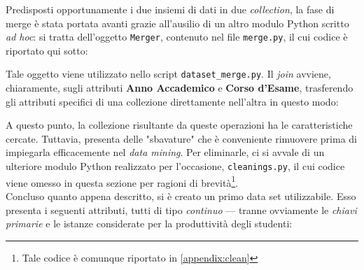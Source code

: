 		Predisposti opportunamente i due insiemi di dati in due \textit{collection}, la fase di merge è stata portata avanti grazie all'ausilio di un altro modulo Python scritto \textit{ad hoc}: si tratta dell'oggetto \texttt{Merger}, contenuto nel file \texttt{merge.py}, il cui codice è riportato qui sotto:

		

		Tale oggetto viene utilizzato nello script \texttt{dataset\_merge.py}. Il \textit{join} avviene, chiaramente, sugli attributi \textbf{Anno Accademico} e \textbf{Corso d'Esame}, trasferendo gli attributi specifici di una collezione direttamente nell'altra in questo modo:

		

		A questo punto, la collezione risultante da queste operazioni ha le caratteristiche cercate. Tuttavia, presenta delle "sbavature" che è conveniente rimuovere prima di impiegarla efficacemente nel \textit{data mining}. Per eliminarle, ci si avvale di un ulteriore modulo Python realizzato per l'occasione, \texttt{cleanings.py}, il cui codice viene omesso in questa sezione per ragioni di brevità\footnote{Tale codice è comunque riportato in \ref{appendix:clean}}. \\

		Concluso quanto appena descritto, si è creato un primo data set utilizzabile. Esso presenta i seguenti attributi, tutti di tipo	\textit{continuo} --- tranne ovviamente le \textit{chiavi primarie} e le istanze considerate per la produttività degli studenti:

